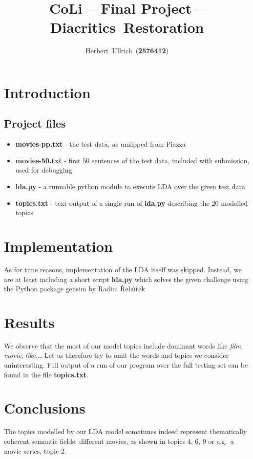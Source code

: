 \documentclass[12pt]{article}
\begin{document}
    \title{CoLi -- Final Project -- Diacritics~Restoration}
    \author{Herbert~Ullrich~(\textbf{2576412})}
    \maketitle
    \section{Introduction}
    \subsection{Project files}
    \begin{itemize}
        \item \textbf{movies-pp.txt} - the test data, as unzipped from \textsf{Piazza}
        \item \textbf{movies-50.txt} - first 50 sentences of the test data, included with submission, used for debugging
        \item \textbf{lda.py} - a runnable python module to execute LDA over the given test data
        \item \textbf{topics.txt} - text output of a single run of \textbf{lda.py} describing the 20 modelled topics
    \end{itemize}
    \section{Implementation}
    As for time reasons, implementation of the LDA itself was skipped.
    Instead, we are at least including a short script \textbf{lda.py} which solves
    the given challenge using the \textsf{Python} package \textsf{gensim} by Radim {\v R}eh{\r u}{\v r}ek~\cite{rehurek_lrec}

    \section{Results}
    We observe that the most of our model topics include dominant words like \textit{film}, \textit{movie}, \textit{like},\ldots
    Let us therefore try to omit the words and topics we consider uninteresting. Full output of a run of our program over the full testing set can be found in the file \textbf{topics.txt}.

    \section{Conclusions}
    The topics modelled by our LDA model sometimes indeed represent thematically coherent semantic fields: different movies, as shown in topics 4, 6, 9 or e.g.\ a movie series, topic 2.
\end{document}
